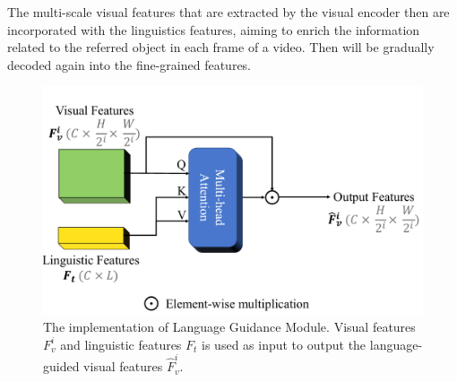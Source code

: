 

The multi-scale visual features that are extracted by the visual encoder then are incorporated with the linguistics features, aiming to enrich the information related to the referred object in each frame of a video. Then will be gradually decoded again into the fine-grained features.


\begin{figure}[t]
    \centering
    \includegraphics[width=\textwidth]{content/resources/images/referring_segmentation/Language Guidance Module.pdf}
    \caption{The implementation of Language Guidance Module. Visual features $F_v^i$ and linguistic features $F_t$ is used as input to output the language-guided visual features $\hat{F}_v^i$.}
    \label{fig:lgm}
\end{figure} 

